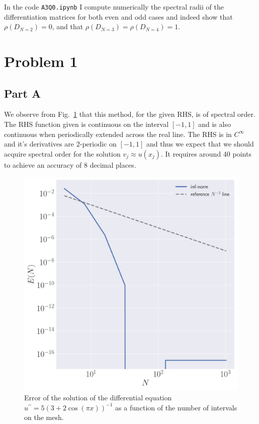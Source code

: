 \documentclass[12pt]{article}
\begin{document}
In the code \verb|A3Q0.ipynb| I compute numerically the spectral radii of the differentiation matrices for both even and odd cases and indeed show that $\rho(D_{N=2}) = 0$, and that $\rho(D_{N=3}) = \rho(D_{N=4}) = 1$.

\section*{Problem 1}

\subsection*{Part A}

We observe from Fig.~\ref{fig:q1a} that this method, for the given RHS, is of spectral order. The RHS function given is continuous on the interval $[-1,1]$ and is also continuous when periodically extended across the real line. The RHS is in $C^{\infty}$ and it's derivatives are 2-periodic on $[-1,1]$ and thus we expect that we should acquire spectral order for the solution $v_{j} \approx u(x_{j})$. It requires around 40 points to achieve an accuracy of 8 decimal places. 

\begin{figure}[!h]
    \centering
    \includegraphics[clip, scale=0.3]{q1a_fig.pdf}
    \caption{Error of the solution of the differential equation $u^{\prime\prime} = 5\left(3+2\cos(\pi x)\right)^{-1}$ as a function of the number of intervals on the mesh.}
    \label{fig:q1a}
\end{figure}
\end{document}
